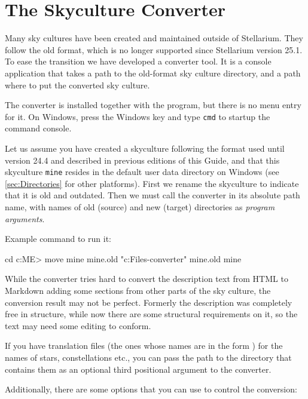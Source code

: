 \section{The Skyculture Converter}
\label{ch:SkyCultures:converter}

Many sky cultures have been created and maintained outside of Stellarium. They follow the old format, which is no longer supported since Stellarium version 25.1. 
To ease the transition we have developed a converter tool. It is a console application that takes a path to the old-format sky culture directory, 
and a path where to put the converted sky culture. 

The converter is installed together with the program, but there is no menu entry for it. 
On Windows, press the Windows key and type \texttt{cmd} to startup the command console. 

Let us assume you have created a skyculture following the format used until version 24.4 and described in previous editions of this Guide, 
and that this skyculture \texttt{mine} resides in the default user data directory on Windows (see \ref{sec:Directories} for other platforms). 
First we rename the skyculture to indicate that it is old and outdated. Then we must call the converter in its absolute path name, 
with names of old (source) and new (target) directories as \emph{program arguments}.

 
Example command to run it:

\begin{commands}[\footnotesize]
cd c:\Users\<ME>\AppData\Roaming\skycultures
move mine mine.old
"c:\Program Files\stellarium\skyculture-converter" mine.old mine
\end{commands}

While the converter tries hard to convert the description text from HTML to Markdown adding some sections from other parts of the sky culture, the conversion result may not be perfect. 
Formerly the description was completely free in structure, while now there are some structural requirements on it, so the text may need some editing to conform.

If you have  translation files (the ones whose names are in the form ) for the names of stars, constellations etc., 
you can pass the path to the directory that contains them as an optional third positional argument to the converter.

Additionally, there are some options that you can use to control the conversion:

